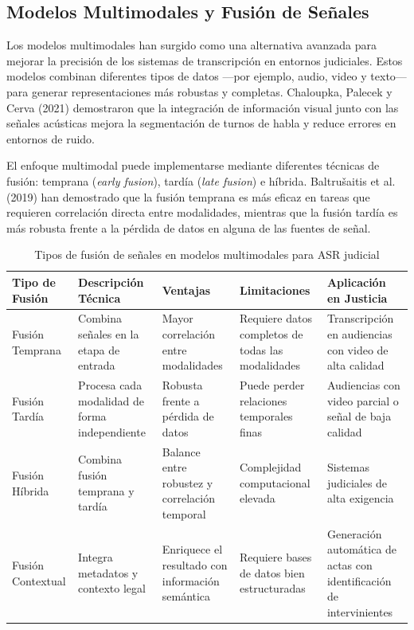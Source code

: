 \documentclass[12pt,a4paper,oneside]{report}
\begin{document}
\subsection{Modelos Multimodales y Fusión de Señales}

Los modelos multimodales han surgido como una alternativa avanzada para mejorar la precisión de los sistemas de transcripción en entornos judiciales. Estos modelos combinan diferentes tipos de datos —por ejemplo, audio, video y texto— para generar representaciones más robustas y completas. Chaloupka, Palecek y Cerva (2021) demostraron que la integración de información visual junto con las señales acústicas mejora la segmentación de turnos de habla y reduce errores en entornos de ruido.

El enfoque multimodal puede implementarse mediante diferentes técnicas de fusión: temprana (\textit{early fusion}), tardía (\textit{late fusion}) e híbrida. Baltrušaitis et al. (2019) han demostrado que la fusión temprana es más eficaz en tareas que requieren correlación directa entre modalidades, mientras que la fusión tardía es más robusta frente a la pérdida de datos en alguna de las fuentes de señal.

\begin{table}[H]
\centering
\caption{Tipos de fusión de señales en modelos multimodales para ASR judicial}
\begin{tabular}{|p{2.5cm}|p{3cm}|p{2.5cm}|p{2.5cm}|p{2.5cm}|}
\hline
\rowcolor{gray!20}
\textbf{Tipo de Fusión} & \textbf{Descripción Técnica} & \textbf{Ventajas} & \textbf{Limitaciones} & \textbf{Aplicación en Justicia} \\
\hline
Fusión Temprana & Combina señales en la etapa de entrada & Mayor correlación entre modalidades & Requiere datos completos de todas las modalidades & Transcripción en audiencias con video de alta calidad \\
\hline
Fusión Tardía & Procesa cada modalidad de forma independiente & Robusta frente a pérdida de datos & Puede perder relaciones temporales finas & Audiencias con video parcial o señal de baja calidad \\
\hline
Fusión Híbrida & Combina fusión temprana y tardía & Balance entre robustez y correlación temporal & Complejidad computacional elevada & Sistemas judiciales de alta exigencia \\
\hline
Fusión Contextual & Integra metadatos y contexto legal & Enriquece el resultado con información semántica & Requiere bases de datos bien estructuradas & Generación automática de actas con identificación de intervinientes \\
\hline
\end{tabular}
\label{tab:fusion}
\end{table}
\end{document}
